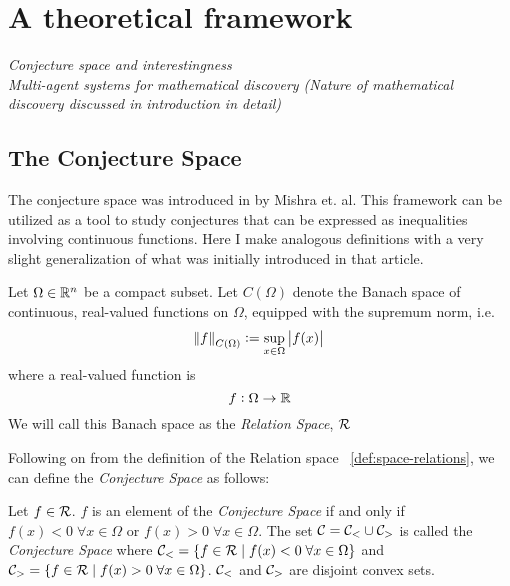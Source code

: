 \chapter{A theoretical framework}
\textit{Conjecture space and interestingness}\\
\textit{Multi-agent systems for mathematical discovery (Nature of mathematical discovery discussed in introduction in detail)}

\section{The Conjecture Space}

The conjecture space was introduced in \cite{mishraConjGen2023} by Mishra et. al. This framework can be utilized as a tool to study conjectures that can be expressed as inequalities involving continuous functions.
Here I make analogous definitions with a very slight generalization of what was initially introduced in that article.

\begin{definition}
    \label{def:space-relations}
    Let $\Omega\in\mathbb{R}^n$ be a compact subset. Let $C(\Omega)$ denote the Banach space of continuous, real-valued functions on $\Omega$, equipped with the supremum norm, i.e.
    \begin{equation*}
        \norm{f}_{C(\Omega)} := \sup_{x\in\Omega} \left|f(x)\right|    
    \end{equation*}
    where a real-valued function is
    \begin{equation*}
        f:\Omega\rightarrow\mathbb{R}
    \end{equation*}
    We will call this Banach space as the \textit{Relation Space}, $\mathcal{R}$
\end{definition}

Following on from the definition of the Relation space ~\ref{def:space-relations}, we can define the \textit{Conjecture Space} as follows:
\begin{definition}
    Let $f\in\mathcal{R}$. $f$ is an element of the \textit{Conjecture Space} if and only if $f(x) < 0 \;\forall x\in\Omega$ or $f(x) > 0 \; \forall x\in\Omega$.
    The set $\mathcal{C} = \mathcal{C}_{<}\cup\mathcal{C}_{>}$ is called the \textit{Conjecture Space} where $\mathcal{C}_{<} = \{f\in\mathcal{R}\;|\; f(x)<0\;\forall x\in\Omega\}$ and $\mathcal{C}_{>} = \{f\in\mathcal{R}\;|\;f(x)>0\;\forall x\in\Omega\}$.
    $\mathcal{C}_{<}$ and $\mathcal{C}_{>}$ are disjoint convex sets.
\end{definition}

